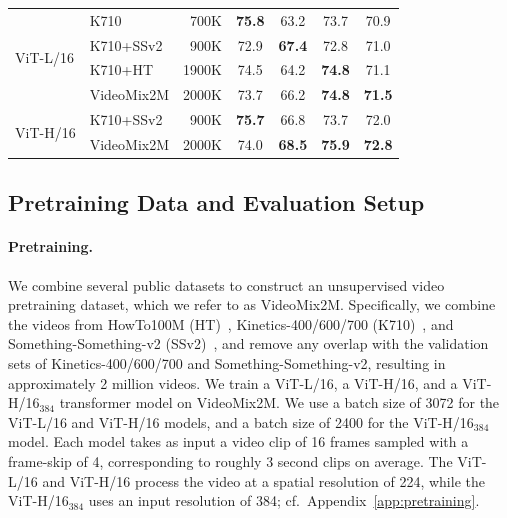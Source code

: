 \documentclass[twocolumn]{fairmeta}
\newcommand{\cc}{\cellcolor{metabg}}
\theoremstyle{plain}
\theoremstyle{definition}
\theoremstyle{remark}
\begin{document}
\begin{table}[t]
{\begin{tabular}{llr ccc c }
        \midrule
        \multirow{4}{*}{ViT-L/16} & K710 & 700K & \bf 75.8 & 63.2 & 73.7 & 70.9 \\
        & K710+SSv2 & 900K & 72.9 & \bf 67.4 & 72.8 & 71.0 \\
        & K710+HT & 1900K & 74.5 & 64.2 & \bf 74.8 &  71.1 \\ \vspace{1ex}
        & VideoMix2M & 2000K & \cc 73.7 & \cc 66.2 & \cc \bf 74.8 & \cc \bf 71.5\\
        \multirow{2}{*}{ViT-H/16} & K710+SSv2 & 900K & \bf 75.7 & 66.8 & 73.7 & 72.0 \\
        & VideoMix2M & 2000K & \cc 74.0 & \cc \bf 68.5 & \cc \bf 75.9 & \cc \bf 72.8\\
        \bottomrule
    \end{tabular}}
\end{table}

\subsection{Pretraining Data and Evaluation Setup}
\label{sec:pretraining_data_distribution}

\paragraph{\bf Pretraining.}
We combine several public datasets to construct an unsupervised video pretraining dataset, which we refer to as VideoMix2M.
Specifically, we combine the videos from HowTo100M (HT)~\citep{miech2019howto100m}, Kinetics-400/600/700 (K710)~\citep{kay2017kinetics}, and Something-Something-v2 (SSv2)~\citep{goyal2017something}, and remove any overlap with the validation sets of Kinetics-400/600/700 and Something-Something-v2, resulting in approximately 2 million videos.
We train a ViT-L/16, a ViT-H/16, and a ViT-H/16$_{384}$  transformer model on VideoMix2M.
We use a batch size of 3072 for the ViT-L/16 and ViT-H/16 models, and a batch size of 2400 for the ViT-H/16$_{384}$ model.
Each model takes as input a video clip of 16 frames sampled with a frame-skip of 4, corresponding to roughly 3 second clips on average.
The ViT-L/16 and ViT-H/16 process the video at a spatial resolution of 224, while the ViT-H/16$_{384}$ uses an input resolution of 384; cf.~Appendix~\ref{app:pretraining}.
\end{document}
